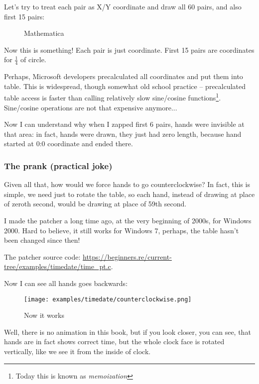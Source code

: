 Let's try to treat each pair as X/Y coordinate and draw all 60 pairs, and also first 15 pairs:

\begin{figure}[H]
\centering
{}
\caption{Mathematica}
\end{figure}

Now this is something!
Each pair is just coordinate.
First 15 pairs are coordinates for $\frac{1}{4}$ of circle.

Perhaps, Microsoft developers precalculated all coordinates and put them into table.
This is widespread, though somewhat old school practice -- precalculated table access is faster than calling relatively slow sine/cosine functions\footnote{Today this is known
as \emph{memoization}}.
Sine/cosine operations are not that expensive anymore...

Now I can understand why when I zapped first 6 pairs, hands were invisible at that area: in fact, hands were drawn,
they just had zero length, because hand started at 0:0 coordinate and ended there.

\subsubsection{The prank (practical joke)}

Given all that, how would we force hands to go counterclockwise?
In fact, this is simple, we need just to rotate the table, so each hand, instead of drawing at place of zeroth second,
would be drawing at place of 59th second.

I made the patcher a long time ago, at the very beginning of 2000s, for Windows 2000.
Hard to believe, it still works for Windows 7, perhaps, the table hasn't been changed since then!

The patcher source code: \url{https://beginners.re/current-tree/examples/timedate/time_pt.c}.

Now I can see all hands goes backwards:

\begin{figure}[H]
\centering
\texttt{[image: examples/timedate/counterclockwise.png]}
\caption{Now it works}
\end{figure}

Well, there is no animation in this book, but if you look closer, you can see, that hands are in fact shows correct
time, but the whole clock face is rotated vertically, like we see it from the inside of clock.

